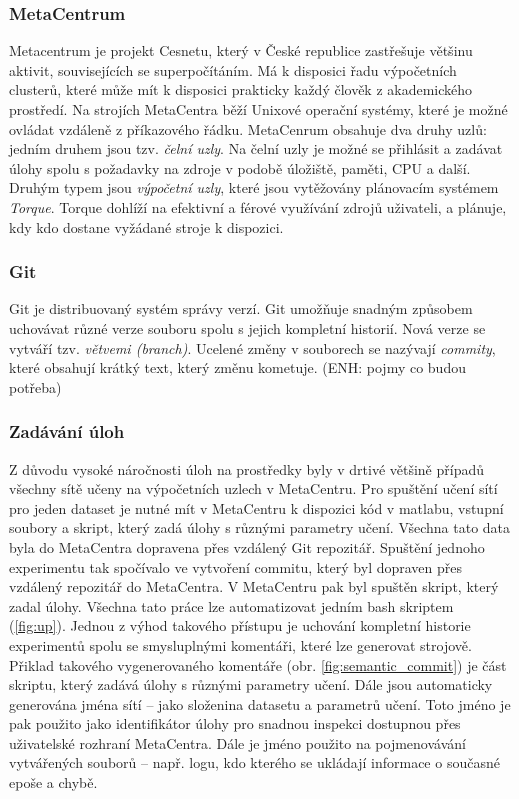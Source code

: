\documentclass[thesis=M,czech]{FITthesis}[2012/06/26]
\begin{document}
\subsubsection*{MetaCentrum}
Metacentrum je projekt Cesnetu, který v České republice zastřešuje většinu aktivit, souvisejících se superpočítáním. Má k disposici řadu výpočetních clusterů, které může mít k disposici prakticky každý člověk z akademického prostředí.
Na strojích MetaCentra běží Unixové operační systémy, které je možné ovládat vzdáleně z příkazového řádku. MetaCenrum obsahuje dva druhy uzlů: jedním druhem jsou tzv. \textit{čelní uzly}.
Na čelní uzly je možné se přihlásit a zadávat úlohy spolu s požadavky na zdroje v podobě úložiště, paměti, CPU a další.
Druhým typem jsou \textit{výpočetní uzly}, které jsou vytěžovány plánovacím systémem \textit{Torque}. Torque dohlíží na efektivní a férové využívání zdrojů uživateli, a plánuje, kdy kdo dostane vyžádané stroje k dispozici. \cite{metacentrum}

\subsubsection*{Git}
Git je distribuovaný systém správy verzí. Git umožňuje snadným způsobem uchovávat různé verze souboru spolu s jejich kompletní historií. Nová verze se vytváří tzv. \textit{větvemi (branch)}. Ucelené změny v souborech se nazývají \textit{commity}, které  obsahují krátký text, který změnu kometuje. (ENH: pojmy co budou potřeba)


\subsubsection*{Zadávání úloh}
Z důvodu vysoké náročnosti úloh na prostředky byly v drtivé většině případů všechny sítě učeny na výpočetních uzlech v MetaCentru. Pro spuštění učení sítí pro jeden dataset je nutné mít v MetaCentru k dispozici kód v matlabu, vstupní soubory a skript, který zadá úlohy s různými parametry učení. Všechna tato data byla do MetaCentra dopravena přes vzdálený Git repozitář. Spuštění jednoho experimentu tak spočívalo ve vytvoření commitu, který byl dopraven přes vzdálený repozitář do MetaCentra. V MetaCentru pak byl spuštěn skript, který zadal úlohy. Všechna tato práce lze automatizovat jedním bash skriptem (\ref{fig:up}). 
Jednou z výhod takového přístupu je uchování kompletní historie experimentů spolu se smysluplnými komentáři, které lze generovat strojově. Přiklad takového vygenerovaného komentáře (obr. \ref{fig:semantic_commit}) je část skriptu, který zadává úlohy s různými parametry učení. Dále jsou automaticky generována jména sítí -- jako složenina datasetu a parametrů učení. Toto jméno je pak použito jako identifikátor úlohy pro snadnou inspekci dostupnou přes uživatelské rozhraní MetaCentra. Dále je jméno použito na pojmenovávání vytvářených souborů -- např. logu, kdo kterého se ukládají informace o současné epoše a chybě.
\end{document}

